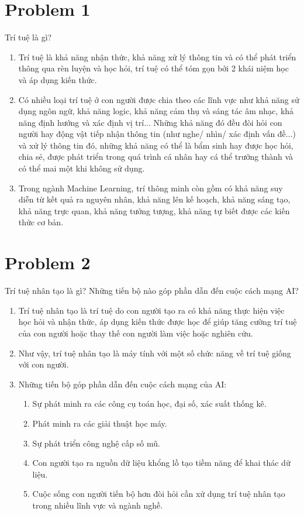 \documentclass[12pt,letterpaper]{article}
\begin{document}
\section*{Problem 1}

Trí tuệ là gì?

\begin{enumerate}
    \item
    Trí tuệ là khả năng nhận thức, khả năng xử lý thông tin và có thể phát triển thông qua rèn luyện và học hỏi, trí tuệ có thể tóm gọn bởi 2 khái niệm học và áp dụng kiến thức.
    \item
    Có nhiều loại trí tuệ ở con người được chia theo các lĩnh vực như khả năng sử dụng ngôn ngữ, khả năng logic, khả năng cảm thụ và sáng tác âm nhạc, khả năng định hướng và xác định vị trí...
    Những khả năng đó đều đòi hỏi con người hay động vật tiếp nhận thông tin (như nghe/ nhìn/ xác định vấn đề...) và xử lý thông tin đó, những khả năng có thể là bẩm sinh hay được học hỏi, chia sẻ, được phát triển trong quá trình cá nhân hay cá thể trưởng thành và có thể mai một khi không sử dụng.
    \item
    Trong ngành Machine Learning, trí thông minh còn gồm có khả năng suy diễn từ kết quả ra nguyên nhân, khả năng lên kế hoạch, khả năng sáng tạo, khả năng trực quan, khả năng tưởng tượng, khả năng tự biết được các kiến thức cơ bản.
\end{enumerate}


\section*{Problem 2}
Trí tuệ nhân tạo là gì? Những tiến bộ nào góp phần dẫn đến cuộc cách mạng AI?
\begin{enumerate}
    \item 
    Trí tuệ nhân tạo là trí tuệ do con người tạo ra có khả năng thực hiện việc học hỏi và nhận thức, áp dụng kiến thức được học để giúp tăng cường trí tuệ của con người hoặc thay thế con người làm việc hoặc nghiên cứu.
    \item
    Như vậy, trí tuệ nhân tạo là máy tính với một số chức năng về trí tuệ giống với con người.
    \item
    Những tiến bộ góp phần dẫn đến cuộc cách mạng của AI:
    \begin{enumerate}
        \item 
        Sự phát minh ra các công cụ toán học, đại số, xác suất thống kê.
        \item
        Phát minh ra các giải thuật học máy.
        \item 
        Sự phát triển công nghệ cấp số mũ.
        \item 
        Con người tạo ra nguồn dữ liệu khổng lồ tạo tiềm năng để khai thác dữ liệu.
        \item
        Cuộc sống con người tiến bộ hơn đòi hỏi cần xử dụng trí tuệ nhân tạo trong nhiều lĩnh vực và ngành nghề.
    \end{enumerate}
\end{enumerate}
\end{document}
